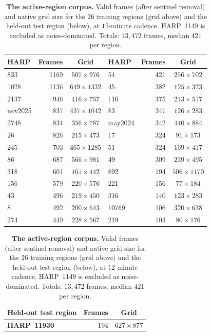 \begin{table}[!htbp]
\centering
\small
\caption[Dataset]{\textbf{The active-region corpus.} Valid frames (after sentinel
removal) and native grid size for the $26$ training regions (grid above) and the
held-out test region (below), at $12$-minute cadence. HARP~1149 is excluded as
noise-dominated. Totals: $13{,}472$ frames, median $421$ per region.}
\label{tab:dataset}
\setlength{\tabcolsep}{5pt}
\renewcommand{\arraystretch}{1.12}
\begin{tabular}{|l|r|c||l|r|c|}
\hline
HARP & Frames & Grid & HARP & Frames & Grid \\
\hline\hline
833     & 1169 & $507\times976$  & 54      & 421 & $256\times702$  \\ \hline
1028    & 1136 & $649\times1332$ & 45      & 382 & $125\times323$  \\ \hline
2137    & 946  & $416\times757$  & 116     & 375 & $213\times517$  \\ \hline
nov2025 & 837  & $437\times1042$ & 83      & 347 & $126\times283$  \\ \hline
2748    & 834  & $356\times787$  & may2024 & 342 & $440\times884$  \\ \hline
26      & 826  & $215\times473$  & 17      & 324 & $91\times173$   \\ \hline
245     & 703  & $465\times1285$ & 51      & 324 & $169\times417$  \\ \hline
86      & 687  & $566\times981$  & 49      & 309 & $239\times495$  \\ \hline
318     & 601  & $161\times442$  & 892     & 194 & $506\times1170$ \\ \hline
156     & 579  & $220\times576$  & 221     & 156 & $77\times184$   \\ \hline
43      & 496  & $219\times450$  & 316     & 140 & $123\times283$  \\ \hline
8       & 492  & $200\times643$  & 10769   & 106 & $320\times638$  \\ \hline
274     & 449  & $228\times567$  & 219     & 103 & $80\times176$   \\ \hline
\end{tabular}

\vspace{5pt}
\begin{tabular}{|l|r|c|}
\hline
\textbf{Held-out test region} & Frames & Grid \\
\hline\hline
\textbf{HARP~11930} & 194 & $627\times877$ \\
\hline
\end{tabular}
\end{table}
